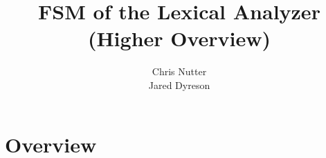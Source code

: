 \documentclass{article}
\title{FSM of the Lexical Analyzer (Higher Overview)}
\author{Chris Nutter \\
        Jared Dyreson}
\begin{document}
\maketitle
\tableofcontents

\newpage

\section{Overview}
\end{document}
